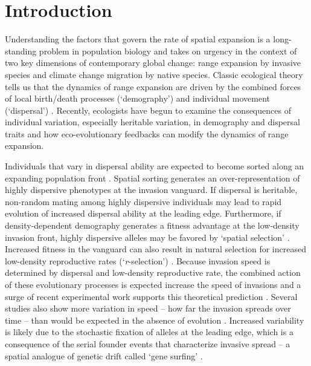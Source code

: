 \documentclass[11pt]{article}
\begin{document}
\newpage{}

\section*{Introduction}
Understanding the factors that govern the rate of spatial expansion is a long-standing problem in population biology and takes on urgency in the context of two key dimensions of contemporary global change: range expansion by invasive species and climate change migration by native species.
Classic ecological theory tells us that the dynamics of range expansion are driven by the combined forces of local birth/death processes (`demography') and individual movement (`dispersal') \citep{skellam_random_1951,okubo_diffusion_1980,kot_discrete-time_1986,kot_dispersal_1996}.
Recently, ecologists have begun to examine the consequences of individual variation, especially heritable variation, in demography and dispersal traits and how eco-evolutionary feedbacks can modify the dynamics of range expansion.

Individuals that vary in dispersal ability are expected to become sorted along an expanding population front \citep{shine_evolutionary_2011}.
Spatial sorting generates an over-representation of highly dispersive phenotypes at the invasion vanguard.
If dispersal is heritable, non-random mating among highly dispersive individuals may lead to rapid evolution of increased dispersal ability at the leading edge.
Furthermore, if density-dependent demography generates a fitness advantage at the low-density invasion front, highly dispersive alleles may be favored by `spatial selection' \citep{phillips_life-history_2010, perkins_evolution_2013}.
Increased fitness in the vanguard can also result in natural selection for increased low-density reproductive rates (`\textit{r}-selection’) \citep{phillips_life-history_2010}.
Because invasion speed is determined by dispersal and low-density reproductive rate, the combined action of these evolutionary processes is expected increase the speed of invasions \citep{phillips_evolutionary_2015} and a surge of recent experimental work supports this theoretical prediction \citep{williams_rapid_2016, ochocki_rapid_2017, weiss-lehman_rapid_2017,van2018kin}.
Several studies also show more variation in speed -- how far the invasion spreads over time -- than would be expected in the absence of evolution \citep{phillips_evolutionary_2015, ochocki_rapid_2017, weiss-lehman_rapid_2017}.
Increased variability is likely due to the stochastic fixation of alleles at the leading edge, which is a consequence of the serial founder events that characterize invasive spread -- a spatial analogue of genetic drift called `gene surfing' \citep{edmonds_mutations_2004,klopfstein_fate_2006,excoffier_surfing_2008,peischl_expansion_2015,phillips_evolutionary_2015, ochocki_rapid_2017, weiss-lehman_rapid_2017}.
\end{document}
